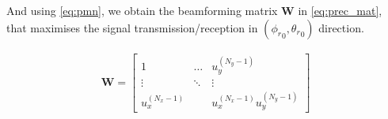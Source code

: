 And using \eqref{eq:pmn}, we obtain the beamforming matrix $\bm{W}$ in \eqref{eq:prec_mat}, that maximises the signal transmission/reception in $({\phi_r}_0, {\theta_r}_0)$ direction.

\begin{align} \label{eq:prec_mat}
    \bm{W} = \begin{bmatrix}
        1 & \dots & u_y^{(N_y-1)}\\
        \vdots & \ddots & \vdots\\
        u_x^{(N_x-1)} &  & u_x^{(N_x-1)}u_y^{(N_y-1)}
        \end{bmatrix}
\end{align}















